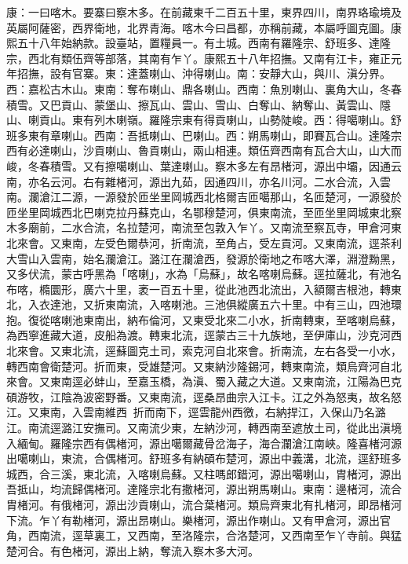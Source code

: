 \begin{pinyinscope}
康：一曰喀木。要寨曰察木多。在前藏東千二百五十里，東界四川，南界珞瑜境及英屬阿薩密，西界衛地，北界青海。喀木今曰昌都，亦稱前藏，本屬呼圖克圖。康熙五十八年始納款。設臺站，置糧員一。有土城。西南有羅隆宗、舒班多、達隆宗，西北有類伍齊等部落，其南有乍丫。康熙五十八年招撫。又南有江卡，雍正元年招撫，設有官寨。東：達蓋喇山、沖得喇山。南：安靜大山，與川、滇分界。西：嘉松古木山。東南：奪布喇山、鼎各喇山。西南：魚別喇山、裏角大山，冬春積雪。又巴貢山、蒙堡山、擦瓦山、雲山、雪山、白奪山、納奪山、黃雲山、隱山、喇貢山。東有列木喇嶺。羅隆宗東有得貢喇山，山勢陡峻。西：得噶喇山。舒班多東有章喇山。西南：吾抵喇山、巴喇山。西：朔馬喇山，即賽瓦合山。達隆宗西有必達喇山，沙貢喇山、魯貢喇山，兩山相連。類伍齊西南有瓦合大山，山大而峻，冬春積雪。又有擦噶喇山、葉達喇山。察木多左有昂楮河，源出中壩，因通云南，亦名云河。右有雜楮河，源出九茹，因通四川，亦名川河。二水合流，入雲南。瀾滄江二源，一源發於匝坐里岡城西北格爾吉匝噶那山，名匝楚河，一源發於匝坐里岡城西北巴喇克拉丹蘇克山，名鄂穆楚河，俱東南流，至匝坐里岡城東北察木多廟前，二水合流，名拉楚河，南流至包敦入乍丫。又南流至察瓦寺，甲倉河東北來會。又東南，左受色爾恭河，折南流，至角占，受左貢河。又東南流，逕茶利大雪山入雲南，始名瀾滄江。潞江在瀾滄西，發源於衛地之布喀大澤，淵澄黝黑，又多伏流，蒙古呼黑為「喀喇」，水為「烏蘇」，故名喀喇烏蘇。逕拉薩北，有池名布喀，橢圜形，廣六十里，袤一百五十里，從此池西北流出，入額爾吉根池，轉東北，入衣達池，又折東南流，入喀喇池。三池俱縱廣五六十里。中有三山，四池環抱。復從喀喇池東南出，納布倫河，又東受北來二小水，折南轉東，至喀喇烏蘇，為西寧進藏大道，皮船為渡。轉東北流，逕蒙古三十九族地，至伊庫山，沙克河西北來會。又東北流，逕蘇圖克土司，索克河自北來會。折南流，左右各受一小水，轉西南會衛楚河。折而東，受雄楚河。又東納沙隆錫河，轉東南流，類烏齊河自北來會。又東南逕必蚌山，至嘉玉橋，為滇、蜀入藏之大道。又東南流，江陽為巴克碩游牧，江陰為波密野番。又東南流，逕桑昂曲宗入江卡。江之外為怒夷，故名怒江。又東南，入雲南維西，折而南下，逕雲龍州西徼，右納捍江，入保山乃名潞江。南流逕潞江安撫司。又南流少東，左納沙河，轉西南至遮放土司，從此出滇境入緬甸。羅隆宗西有偶楮河，源出噶爾藏骨岔海子，海合瀾滄江南峽。隆喜楮河源出噶喇山，東流，合偶楮河。舒班多有納碩布楚河，源出中義溝，北流，逕舒班多城西，合三溪，東北流，入喀喇烏蘇。又柱嗎郎錯河，源出噶喇山，胄楮河，源出吾抵山，均流歸偶楮河。達隆宗北有撒楮河，源出朔馬喇山。東南：邊楮河，流合胄楮河。有俄楮河，源出沙貢喇山，流合葉楮河。類烏齊東北有扎楮河，即昂楮河下流。乍丫有勒楮河，源出昂喇山。樂楮河，源出作喇山。又有甲倉河，源出官角，西南流，逕草裏工，又西南，至洛隆宗，合洛楚河，又西南至乍丫寺前。與猛楚河合。有色楮河，源出上納，奪流入察木多大河。


\end{pinyinscope}
